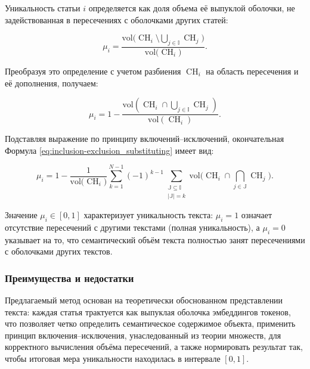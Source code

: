 Уникальность статьи $i$ определяется как доля объема её выпуклой оболочки, не задействованная в пересечениях с оболочками других статей:

\begin{equation}
    \mu_i = \frac{\mathrm{vol}\Big( \operatorname{CH}_i \setminus \bigcup_{j \in \mathbb{I}} \operatorname{CH}_j\Big)}{\mathrm{vol}\Big( \operatorname{CH}_i\Big)}.
\end{equation}

Преобразуя это определение с учетом разбиения $\operatorname{CH}_i$ на область пересечения и её дополнения, получаем:

\begin{equation}
    \mu_i = 1 - \frac{\mathrm{vol}\left(\operatorname{CH}_i \cap \bigcup_{j \in \mathbb{I}}\operatorname{CH}_j\right)}{\mathrm{vol}\left(\operatorname{CH}_i\right)}.
\end{equation}

Подставляя выражение по принципу включений–исключений, окончательная Формула \ref{eq:inclusion-exclusion_substituting} имеет вид:

\begin{equation}\label{eq:uniqueness}
    \mu_i = 1 - \frac{1}{\mathrm{vol}\big(\operatorname{CH}_i\big)}
    \sum_{k=1}^{N-1} (-1)^{k-1} \sum_{\substack{\mathbb{J} \subseteq \mathbb{I} \\ |\mathbb{J}| = k}}
    \mathrm{vol}\Big(\operatorname{CH}_i \cap \bigcap_{j \in \mathbb{J}}\operatorname{CH}_j\Big).
\end{equation}

Значение $\mu_i \in [0, 1]$ характеризует уникальность текста: $\mu_i = 1$ означает отсутствие пересечений с другими текстами
(полная уникальность), а $\mu_i = 0$ указывает на то, что семантический объём текста полностью занят пересечениями с оболочками других текстов.

\subsubsection{Преимущества и недостатки}
Предлагаемый метод основан на теоретически обоснованном представлении текста: каждая
статья трактуется как выпуклая оболочка эмбеддингов токенов, что позволяет четко определить
семантическое содержимое объекта, применить принцип включения–исключения, унаследованный из
теории множеств, для корректного вычисления объёма пересечений, а также нормировать результат
так, чтобы итоговая мера уникальности находилась в интервале $[0,1]$.

